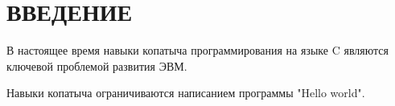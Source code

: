 \chapter*{ВВЕДЕНИЕ}
В настоящее время навыки копатыча программирования на языке C являются ключевой проблемой развития ЭВМ.

Навыки копатыча ограничиваются написанием программы "Hello world".
